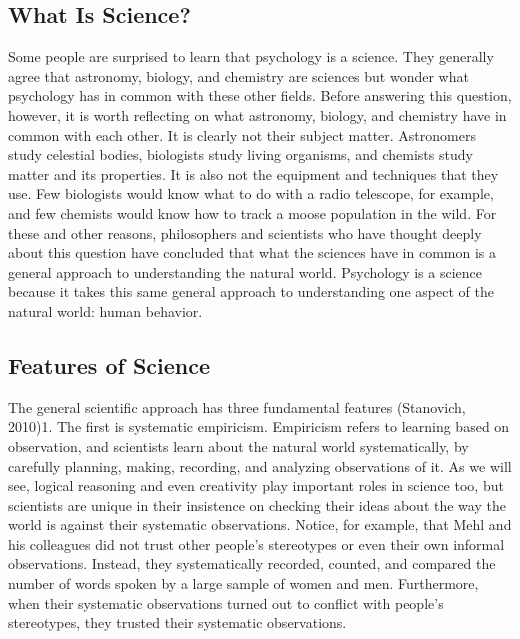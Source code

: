 \subsection{What Is Science?}
Some people are surprised to learn that psychology is a science. They generally agree that astronomy, biology, and chemistry are sciences but wonder what psychology has in common with these other fields. Before answering this question, however, it is worth reflecting on what astronomy, biology, and chemistry have in common with each other. It is clearly not their subject matter. Astronomers study celestial bodies, biologists study living organisms, and chemists study matter and its properties. It is also not the equipment and techniques that they use. Few biologists would know what to do with a radio telescope, for example, and few chemists would know how to track a moose population in the wild. For these and other reasons, philosophers and scientists who have thought deeply about this question have concluded that what the sciences have in common is a general approach to understanding the natural world. Psychology is a science because it takes this same general approach to understanding one aspect of the natural world: human behavior.

\subsection{Features of Science}
The general scientific approach has three fundamental features (Stanovich, 2010)1. The first is systematic empiricism. Empiricism refers to learning based on observation, and scientists learn about the natural world systematically, by carefully planning, making, recording, and analyzing observations of it. As we will see, logical reasoning and even creativity play important roles in science too, but scientists are unique in their insistence on checking their ideas about the way the world is against their systematic observations. Notice, for example, that Mehl and his colleagues did not trust other people's stereotypes or even their own informal observations. Instead, they systematically recorded, counted, and compared the number of words spoken by a large sample of women and men. Furthermore, when their systematic observations turned out to conflict with people's stereotypes, they trusted their systematic observations.

